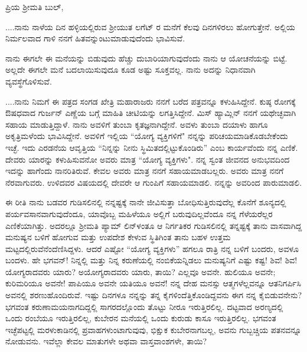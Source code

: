 \noindent
ಪ್ರಿಯ ಶ‍್ರೀಮತಿ ಬುಲ್,

\vspace{0.15cm}

....ನಾನು ನಾಳೆಯ ದಿನ ಹಳ್ಳಿಯಲ್ಲಿರುವ ಶ‍್ರೀಯುತ ಲಗೆಟ್ ರ ಮನೆಗೆ ಕೆಲವು ದಿನಗಳಿರಲು ಹೋಗುತ್ತೇನೆ. ಅಲ್ಲಿಯ ನಿರ್ಮಲವಾದ ಗಾಳಿ ನನಗೆ ಹಿತವನ್ನುಂಟುಮಾಡುವುದೆಂದು ಭಾವಿಸುವೆ.

\vspace{0.15cm}

ನಾನು ಈಗಲೇ ಈ ಮನೆಯನ್ನು ಬಿಡುವುದು ಹೆಚ್ಚು ದುಬಾರಿಯಾಗುವುದೆಂದು ನಾನು ಆ ಯೋಚನೆಯನ್ನು ಬಿಟ್ಟೆ. ಅಲ್ಲದೇ ಈಗಲೇ ಮನೆ ಬದಲಾಯಿಸುವುದೂ ಕೂಡ ಅಷ್ಟು ಸೂಕ್ತವಲ್ಲ. ನಾನು ಅದನ್ನು ನಿಧಾನವಾಗಿ ವ್ಯವಸ್ಥೆಗೊಳಿಸುವೆ.

\vspace{0.15cm}

....ನಾನು ನಿಮಗೆ ಈ ಪತ್ರದ ಸಂಗಡ ಖೇತ್ರಿ ಮಹಾರಾಜರು ನನಗೆ ಬರೆದ ಪತ್ರವನ್ನೂ ಕಳುಹಿಸಿದ್ದೇನೆ. ಕುಷ್ಠ ರೋಗಕ್ಕೆ ಔಷಧವಾದ ಗುರ್ಜನ್ ಎಣ್ಣೆಯ ಬಗ್ಗೆ ಮಾಹಿತಿ ಚೀಟಿಯನ್ನು ಲಗತ್ತಿಸಿದ್ದೇನೆ. ಮಿಸ್ ಹ್ಯಾಮ್ಲಿನ್ ನನಗೆ ಯಥೇಚ್ಛವಾಗಿ ಸಹಾಯ ಮಾಡುತ್ತಿದ್ದಾಳೆ. ನಾನು ಅವಳಿಗೆ ತುಂಬಾ ಕೃತಜ್ಞನಾಗಿದ್ದೇನೆ. ಅವಳು ತುಂಬಾ ದಯಾಳು ಹಾಗೂ ಅಕೃತ್ರಿಮಳೆಂದು ಭಾವಿಸಿದ್ದೇನೆ. ಅವಳಿಗೆ ಇಲ್ಲಿಯ “ಯೋಗ್ಯ ವ್ಯಕ್ತಿಗಳಿಗೆ" ನನ್ನನ್ನು ಪರಿಚಯಮಾಡಿಕೊಡಬೇಕೆಂದು ಇಚ್ಛೆ. ಇದು ಎರಡನೆಯ ಆವೃತ್ತಿಯ “ನಿನ್ನನ್ನು ನೀನು ಸ್ಥಿಮಿತದಲ್ಲಿಟ್ಟುಕೊಂಡಿರು'' ಎಂಬ ಕಾರ್ಯವೆಂದು ನನ್ನ ಎಣಿಕೆ. ದೇವರು ಯಾರನ್ನು ಕಳುಹಿಸುವನೋ ಅವರು ಮಾತ್ರ “ಯೋಗ್ಯ ವ್ಯಕ್ತಿಗಳು". ನನ್ನ ಸ್ವಂತ ಜೀವನದ ಅನುಭವದಿಂದ ಇದನ್ನು ಹಾಗೆಂದು ನಾನರಿತಿರುವೆ. ಕೇವಲ ಅವರು ಮಾತ್ರ ನನಗೆ ಸಹಾಯಮಾಡಬಲ್ಲರು. ಅವರು ಮಾತ್ರ ನನಗೆ ನೆರವಾಗುವರು. ಉಳಿದವರ ವಿಷಯದಲ್ಲಿ ದೇವರೇ ಆ ಗುಂಪಿಗೆ ಸಹಾಯಮಾಡಲಿ. ನನ್ನನ್ನು ಅವರಿಂದ ಪಾರುಮಾಡಲಿ.

\vspace{0.15cm}

ಈ ರೀತಿ ನಾನು ಬಡವರ ಗುಡಿಸಲಿನಲ್ಲಿ ನನ್ನಷ್ಟಕ್ಕೆ ನಾನೇ ಜೀವಿಸುತ್ತಾ ಬೋಧಿಸುತ್ತಿರುವುದೆಲ್ಲ ಕೊನೆಗೆ ಶೂನ್ಯದಲ್ಲಿ ಪರ್ಯವಸಾನವಾಗುವುದೆಂದೂ, ಯಾವೊಬ್ಬ ಮಹಿಳೆಯೂ ಅಲ್ಲಿಗೆ ಬರುವುದಿಲ್ಲವೆಂದೂ ನನ್ನ ಗೆಳೆಯರೆಲ್ಲರ ಎಣಿಕೆಯಾಗಿತ್ತು. ಅದರಲ್ಲೂ ಶ‍್ರೀಮತಿ ಪ್ಯಾಮ್ ಲಿನ್‌ಳಂತೂ ಆ ನಿರ್ಗತಿಕರ ಗುಡಿಸಲಿನಲ್ಲಿ ತನ್ನಷ್ಟಕ್ಕೆ ತಾನು ವಾಸವಾಗಿದ್ದ ಮನುಷ್ಯನ ಬಳಿಗೆ ಹೋಗುವ ಮತ್ತು ಉಪದೇಶ ಕೇಳುವ ಸ್ಥಿತಿಗಿಂತ ತಾನು ಬಹಳ ಉತ್ತಮ ಮಟ್ಟದಲ್ಲಿರುವೆನೆಂದೆಣಿಸಿದ್ದಳು. ಆದರೆ ಎಷ್ಟೋ “ಯೋಗ್ಯ ವ್ಯಕ್ತಿಗಳು'' ಹಗಲೂ ರಾತ್ರಿ ನನ್ನ ಬಳಿಗೆ ಬಂದರು, ಅವಳೂ ಬಂದಳು. ಹೇ ಭಗವನ್! ನಿನ್ನಲ್ಲಿ ಮತ್ತು ನಿನ್ನ ಕರುಣೆಯಲ್ಲಿ ನಂಬಿಕೆಯನ್ನಿಡಲು ಮನುಷ್ಯನಿಗೆ ಎಷ್ಟು ಕಷ್ಟ! ಶಿವ! ಶಿವ! ಯೋಗ್ಯರಾದವರು ಯಾರು? ಅಯೋಗ್ಯರಾದವರು ಯಾರು, ತಾಯಿ? ಎಲ್ಲವೂ ಅವನೇ. ಹುಲಿಯೂ ಅವನೇ; ಕುರಿಮರಿಯೂ ಅವನೇ! ಪಾಪಿಯೂ ಅವನೇ ಯತಿಯೂ ಅವನೆ! ನನ್ನ ದೇಹ ಮನಸ್ಸು ಆತ್ಮಗಳೆಲ್ಲವನ್ನೂ ಆತನಿಗರ್ಪಿಸಿ ಅವನಲ್ಲಿ ಶರಣುಹೊಂದಿರುವೆ. ಇಷ್ಟು ದಿನಗಳೂ ನನ್ನನ್ನು ತನ್ನ ಕೈಗಳಿಂದೆತ್ತಿಕೊಂಡಿದ್ದವನು ಈಗ ನನ್ನ ಕೈಬಿಡುವನೇನು? ಭಗವಂತ ಕರುಣಾಮಯನಾಗದಿದ್ದಲ್ಲಿ ಸಾಗರದಲ್ಲೊಂದು ತೊಟ್ಟು ನೀರೂ ಇರುತ್ತಿರಲಿಲ್ಲ. ದಟ್ಟವಾದ ಅರಣ್ಯದಲ್ಲಿ ಒಂದು ರಂಬೆಯೂ ಇರುತ್ತಿರಲಿಲ್ಲ, ಕುಬೇರನ ಮನೆಯಲ್ಲಿ ಒಂದು ಕುರುಡು ಕಾಸೂ ಇರುತ್ತಿರಲಿಲ್ಲ. ಭಗವಂತ ಇಚ್ಛೆಪಟ್ಟಲ್ಲಿ ಮರಳುಕಾಡಿನಲ್ಲಿ ಪ್ರವಾಹಗಳುಂಟಾಗುವುವು, ಭಿಕ್ಷುಕ ಕುಬೇರನಾಗಬಲ್ಲ, 
ಅವನು ಗುಬ್ಬಚ್ಚಿಯ ಪತನವನ್ನೂ ನೋಡುವನು. ಇವೆಲ್ಲಾ ಕೇವಲ ಮಾತುಗಳೇ ಅಥವಾ ವಾಸ್ತವಾಂಶಗಳೇ, ತಾಯಿ?

